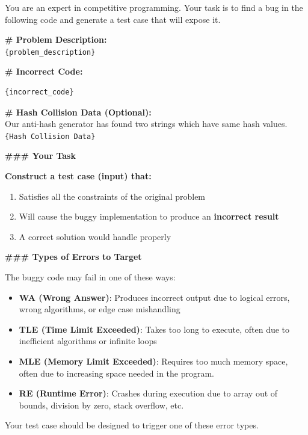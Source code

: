 \documentclass[11pt]{article}
\begin{document}
\begin{promptbox}
\small %

You are an expert in competitive programming. Your task is to find a bug in the following code and generate a test case that will expose it.

\vspace{0.5em}
\noindent\textbf{\# Problem Description:} \\
\texttt{\{problem\_description\}}

\vspace{0.5em}
\noindent\textbf{\# Incorrect Code:}
\begin{lstlisting}[style=cppstyle]
{incorrect_code}
\end{lstlisting}

\vspace{0.5em}
\noindent\textbf{\# Hash Collision Data (Optional):} \\
Our anti-hash generator has found two strings which have same hash values.
\texttt{\{Hash Collision Data\}}

\vspace{0.5em}
\noindent\textbf{\#\#\# Your Task}

\textbf{Construct a test case (input) that:}
\begin{enumerate}
    \setlength\itemsep{0em}
    \item Satisfies all the constraints of the original problem
    \item Will cause the buggy implementation to produce an \textbf{incorrect result}
    \item A correct solution would handle properly
\end{enumerate}

\noindent\textbf{\#\#\# Types of Errors to Target}

The buggy code may fail in one of these ways:
\begin{itemize}
    \setlength\itemsep{0em}
    \item \textbf{WA (Wrong Answer)}: Produces incorrect output due to logical errors, wrong algorithms, or edge case mishandling
    \item \textbf{TLE (Time Limit Exceeded)}: Takes too long to execute, often due to inefficient algorithms or infinite loops
    \item \textbf{MLE (Memory Limit Exceeded)}: Requires too much memory space, often due to increasing space needed in the program.
    \item \textbf{RE (Runtime Error)}: Crashes during execution due to array out of bounds, division by zero, stack overflow, etc.
\end{itemize}
Your test case should be designed to trigger one of these error types.


\end{promptbox}
\end{document}
